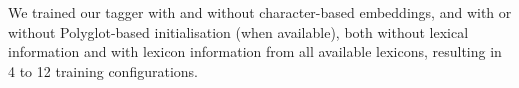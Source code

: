 \documentclass[11pt,a4paper]{article}
\begin{document}
We trained our tagger with and without character-based embeddings, and with or without Polyglot-based
initialisation (when available), both without lexical information and with lexicon information from all available
lexicons, resulting in 4 to 12 training configurations. 

\addtocounter{footnote}{-1}

\end{document}

